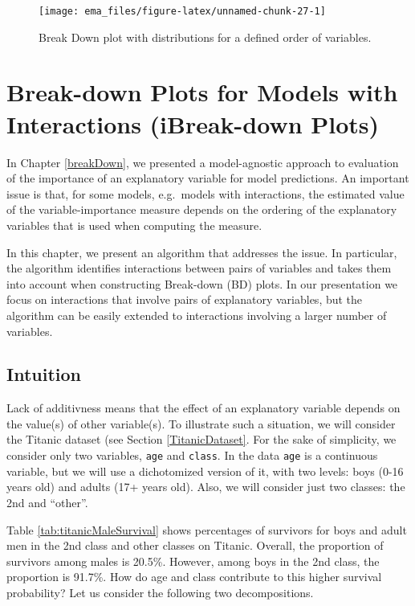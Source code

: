 \documentclass[12pt,]{krantz}
\begin{document}
\begin{figure}

{\centering \texttt{[image: ema\_files/figure-latex/unnamed-chunk-27-1]} 

}

\caption{Break Down plot with distributions for a defined order of variables.}\label{fig:unnamed-chunk-27}
\end{figure}

\hypertarget{iBreakDown}{%
\section{Break-down Plots for Models with Interactions (iBreak-down Plots)}\label{iBreakDown}}

In Chapter \ref{breakDown}, we presented a model-agnostic approach to evaluation of the importance of an explanatory variable for model predictions. An important issue is that, for some models, e.g.~models with interactions, the estimated value of the variable-importance measure depends on the ordering of the explanatory variables that is used when computing the measure.

In this chapter, we present an algorithm that addresses the issue. In particular, the algorithm identifies interactions between pairs of variables and takes them into account when constructing Break-down (BD) plots. In our presentation we focus on interactions that involve pairs of explanatory variables, but the algorithm can be easily extended to interactions involving a larger number of variables.

\hypertarget{iBDIntuition}{%
\subsection{Intuition}\label{iBDIntuition}}

Lack of additivness means that the effect of an explanatory variable depends on the value(s) of other variable(s). To illustrate such a situation, we will consider the Titanic dataset (see Section \ref{TitanicDataset}. For the sake of simplicity, we consider only two variables, \texttt{age} and \texttt{class}. In the data \texttt{age} is a continuous variable, but we will use a dichotomized version of it, with two levels: boys (0-16 years old) and adults (17+ years old). Also, we will consider just two classes: the 2nd and ``other''.

Table \ref{tab:titanicMaleSurvival} shows percentages of survivors for boys and adult men in the 2nd class and other classes on Titanic. Overall, the proportion of survivors among males is 20.5\%. However, among boys in the 2nd class, the proportion is 91.7\%. How do age and class contribute to this higher survival probability? Let us consider the following two decompositions.
\end{document}
